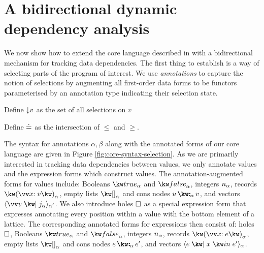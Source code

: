 \section{A bidirectional dynamic dependency analysis}
\label{sec:data-dependencies}

We now show how to extend the core language described in  with a bidirectional mechanism for tracking data dependencies. The first thing to establish is a way of selecting parts of the program of interest. We use \textit{annotations} to capture the notion of selections by augmenting all first-order data forms to be functors parameterised by an annotation type indicating their selection state.






\begin{definition}[?]
   Define ${\downarrow}{v}$ as the set of all selections on $v$
\end{definition}

\begin{definition}
   Define $\doteq$ as the intersection of $\leq$ and $\geq$.
\end{definition}





\noindent
The syntax for annotations $\alpha, \beta$ along with the annotated forms of our core language are given in Figure \ref{fig:core-syntax-selection}. As we are primarily interested in tracking data dependencies between values, we only annotate values and the expression forms which construct values. The annotation-augmented forms for values include: Booleans $\annTrue{\alpha}$ and $\annFalse{\alpha}$, integers $n_{\alpha}$, records $\annRec{\vec{\bind{x}{v}}}{\alpha}$, empty lists $\annNil{\alpha}$ and cons nodes $\annCons{u}{v}{\alpha}$, and vectors $\annVecVal{\vec{v}}{\annInt{j}{\alpha}}{\smash{\alpha'}}$. We also introduce holes $\square$ as a special expression form that expresses annotating every position within a value with the bottom element of a lattice. The corresponding annotated forms for expressions then consist of: holes $\square$, Booleans $\annTrue{\alpha}$ and $\annFalse{\alpha}$, integers $n_{\alpha}$, records $\annRec{\vec{\bind{x}{e}}}{\alpha}$, empty lists $\annNil{\alpha}$ and cons nodes $\annCons{e}{e'}{\alpha}$, and vectors $\annVec{e}{x}{e'}{\alpha}$.

